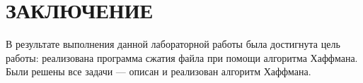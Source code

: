 \chapter*{ЗАКЛЮЧЕНИЕ}


В результате выполнения данной лабораторной работы была достигнута цель работы: реализована программа сжатия файла при помощи алгоритма Хаффмана.
Были решены все задачи — описан и реализован алгоритм Хаффмана.


